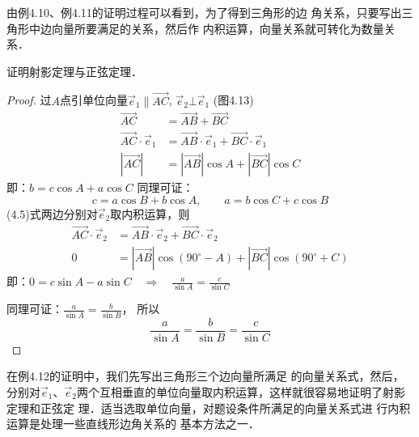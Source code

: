 由例4.10、例4.11的证明过程可以看到，为了得到三角形的边
角关系，只要写出三角形中边向量所要满足的关系，然后作
内积运算，向量关系就可转化为数量关系．



\begin{example}
    证明射影定理与正弦定理．
\end{example}

\begin{proof}
过$A$点引单位向量$\vec{e}_1\parallel \Vec{AC}$, $\vec{e}_2
\bot \vec{e}_1$ (图4.13)
\begin{equation}
    \begin{split}
    \Vec{AC}&=\Vec{AB}+\Vec{BC}\\
    \Vec{AC}\cdot \vec{e}_1&=\Vec{AB}\cdot \vec{e}_1+\Vec{BC}\cdot \vec{e}_1\\
    |\Vec{AC}|&=|\Vec{AB}|\cos A+|\Vec{BC}|\cos C
\end{split}
\end{equation}
即：$b=c\cos A+a\cos C$
同理可证：
\[c=a\cos B+b\cos A,\qquad a=b\cos C+c\cos B\]
(4.5)式两边分别对$\vec{e}_2$取内积运算，则
\[\begin{split}
    \Vec{AC}\cdot \vec{e}_2&=\Vec{AB}\cdot \vec{e}_2+\Vec{BC}\cdot \vec{e}_2\\
    0&=|\Vec{AB}|\cos(90^{\circ}-A)+| \Vec{BC} |\cos(90^{\circ}+C)
\end{split}\]
即：$0=c\sin A-a\sin C\quad \Rightarrow\quad \frac{a}{\sin A}=\frac{c}{\sin C}$

同理可证：$\frac{a}{\sin A}=\frac{b}{\sin B}$，
所以
\[\frac{a}{\sin A}=\frac{b}{\sin B}=\frac{c}{\sin C}\]
\end{proof}

在例4.12的证明中，我们先写出三角形三个边向量所满足
的向量关系式，然后，分别对$\vec{e}_1$、$\vec{e}_2$两个互相垂直的单位向量取内积运算，这样就很容易地证明了射影定理和正弦定
理．适当选取单位向量，对题设条件所满足的向量关系式进
行内积运算是处理一些直线形边角关系的
基本方法之一．


